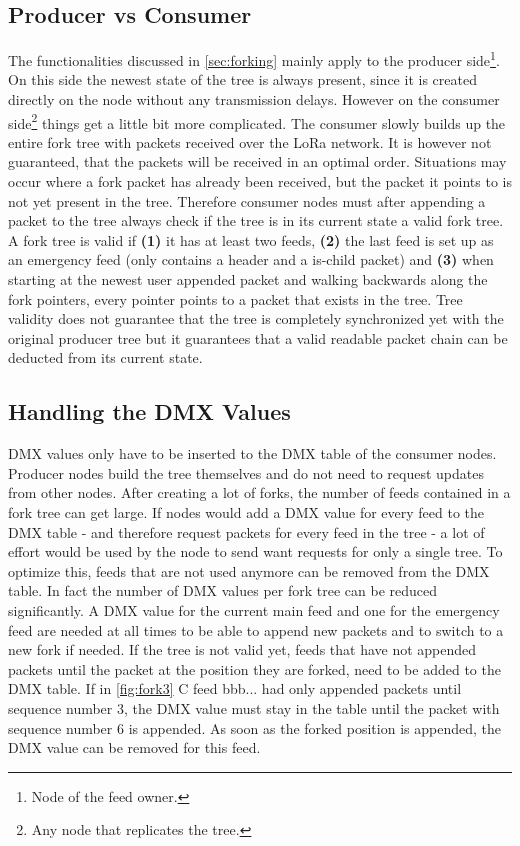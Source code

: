 \subsection{Producer vs Consumer}
The functionalities discussed in \cref{sec:forking} mainly apply to the producer side\footnote{Node of the feed owner.}. On this side the newest state of the tree is always present, since it is created directly on the node without any transmission delays. However on the consumer side\footnote{Any node that replicates the tree.} things get a little bit more complicated. The consumer slowly builds up the entire fork tree with packets received over the LoRa network. It is however not guaranteed, that the packets will be received in an optimal order. Situations may occur where a fork packet has already been received, but the packet it points to is not yet present in the tree. Therefore consumer nodes must after appending a packet to the tree always check if the tree is in its current state a valid fork tree. A fork tree is valid if \textbf{(1)} it has at least two feeds, \textbf{(2)} the last feed is set up as an emergency feed (only contains a header and a is-child packet) and \textbf{(3)} when starting at the newest user appended packet and walking backwards along the fork pointers, every pointer points to a packet that exists in the tree. Tree validity does not guarantee that the tree is completely synchronized yet with the original producer tree but it guarantees that a valid readable packet chain can be deducted from its current state.

\subsection{Handling the DMX Values}
\label{sec:dmxfork}
DMX values only have to be inserted to the DMX table of the consumer nodes. Producer nodes build the tree themselves and do not need to request updates from other nodes.
After creating a lot of forks, the number of feeds contained in a fork tree can get large. If nodes would add a DMX value for every feed to the DMX table - and therefore request packets for every feed in the tree - a lot of effort would be used by the node to send want requests for only a single tree. To optimize this, feeds that are not used anymore can be removed from the DMX table. In fact the number of DMX values per fork tree can be reduced significantly. A DMX value for the current main feed and one for the emergency feed are needed at all times to be able to append new packets and to switch to a new fork if needed. If the tree is not valid yet, feeds that have not appended packets until the packet at the position they are forked, need to be added to the DMX table. If in \cref{fig:fork3} C feed bbb... had only appended packets until sequence number 3, the DMX value must stay in the table until the packet with sequence number 6 is appended. As soon as the forked position is appended, the DMX value can be removed for this feed.


